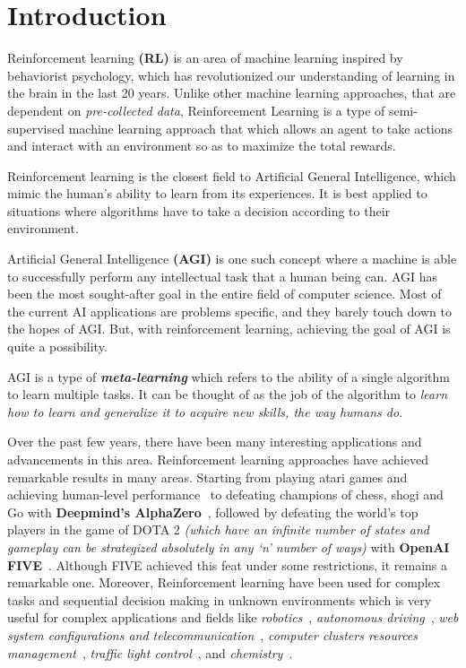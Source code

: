 
\chapter{Introduction}\label{chapter:introduction}
Reinforcement learning \textbf{(RL)} is an area of machine learning inspired by behaviorist psychology, which has revolutionized our understanding of learning in the brain in the last 20 years. Unlike other machine learning approaches, that are dependent on \textit{pre-collected data}, Reinforcement Learning is a type of semi-supervised machine learning approach that which allows an agent to take actions and interact with an environment so as to maximize the total rewards.

Reinforcement learning is the closest field to Artificial General Intelligence, which mimic the human’s ability to learn from its experiences. It is best applied to situations where algorithms have to take a decision according to their environment.

Artificial General Intelligence \textbf{(AGI)} is one such concept where a machine is able to successfully perform any intellectual task that a human being can. AGI has been the most sought-after goal in the entire field of computer science. Most of the current AI applications are problems specific, and they barely touch down to the hopes of AGI. But, with reinforcement learning, achieving the goal of AGI is quite a possibility.

AGI is a type of \textit{\textbf{meta-learning}} which refers to the ability of a single algorithm to learn multiple tasks. It can be thought of as the job of the algorithm to \textit{learn how to learn and generalize it to acquire new skills, the way humans do.}

Over the past few years, there have been many interesting applications and advancements in this area. Reinforcement learning approaches have achieved remarkable results in many areas. Starting from playing atari games and achieving human-level performance~\parencite{mnih2015human} to defeating champions of chess, shogi and Go with \textbf{Deepmind's AlphaZero}~\parencite{silver2017mastering}, followed by defeating the world’s top players in the game of DOTA 2 \textit{(which  have an infinite number of states and gameplay can be strategized absolutely in any ‘n’ number of ways)} with \textbf{OpenAI FIVE}~\parencite{OpenAI_dota}. Although FIVE achieved this feat under some restrictions, it remains a remarkable one. Moreover, Reinforcement learning have been used for complex tasks and sequential decision making in unknown environments which is very useful for complex applications and fields like \textit{robotics}~\parencite{kober2013reinforcement, levine2016end, 45926, singh2019end}, \textit{autonomous driving}~\parencite{sallab2017deep, xu2018zero}, \textit{web system configurations and telecommunication}~\parencite{bu2009reinforcement}, \textit{computer clusters resources management}~\parencite{mao2016resource}, \textit{traffic light control}~\parencite{arel2010reinforcement}, and \textit{chemistry}~\parencite{zhou2017optimizing}.

